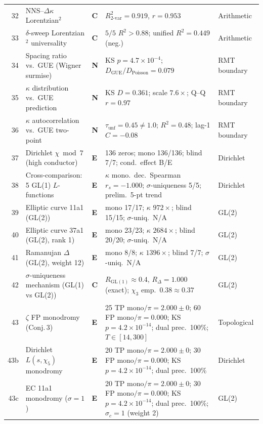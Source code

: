 \documentclass[11pt, a4paper]{article}
\theoremstyle{definition}
\theoremstyle{plain}
\begin{document}
\begin{center}
\begin{longtable}{@{}r l l p{4.2cm} l@{}}
32 & NNS--$\Delta\kappa$ Lorentzian$^2$ & \textbf{C} & $R^2_\text{2-var}{=}0.919$, $r{=}0.953$ & Arithmetic \\
33 & $\delta$-sweep Lorentzian$^2$ universality & \textbf{C} & $5/5$ $R^2{>}0.88$; unified $R^2{=}0.449$ (neg.) & Arithmetic \\
\midrule
34 & Spacing ratio vs.\ GUE (Wigner surmise)  & \textbf{N} & KS $p{=}4.7{\times}10^{-4}$; $D_\text{GUE}/D_\text{Poisson}{=}0.079$ & RMT boundary \\
35 & $\kappa$ distribution vs.\ GUE prediction & \textbf{N} & KS $D{=}0.361$; scale $7.6{\times}$; Q--Q $r{=}0.97$ & RMT boundary \\
36 & $\kappa$ autocorrelation vs.\ GUE two-point & \textbf{N} & $\tau_\text{unf}{=}0.45{\neq}1.0$; $R^2{=}0.48$; lag-1 $C{=}{-}0.08$ & RMT boundary \\
\midrule
37 & Dirichlet $\chi\bmod 7$ (high conductor) & \textbf{E} & 136 zeros; mono 136/136; blind 7/7; cond.\ effect B/E & Dirichlet \\
38 & Cross-comparison: 5 GL(1) $L$-functions & \textbf{E} & $\kappa$ mono.\ dec.\ Spearman $r_s{=}{-}1.000$; $\sigma$-uniqueness 5/5; prelim.\ 5-pt trend & Dirichlet \\
\midrule
39 & Elliptic curve 11a1 (GL(2)) & \textbf{E} & mono 17/17; $\kappa$ $972\times$; blind 15/15; $\sigma$-uniq.\ N/A & GL(2) \\
40 & Elliptic curve 37a1 (GL(2), rank 1) & \textbf{E} & mono 23/23; $\kappa$ $2684\times$; blind 20/20; $\sigma$-uniq.\ N/A & GL(2) \\
41 & Ramanujan $\Delta$ (GL(2), weight 12) & \textbf{E} & mono 8/8; $\kappa$ $1396\times$; blind 7/7; $\sigma$-uniq.\ N/A & GL(2) \\
42 & $\sigma$-uniqueness mechanism (GL(1) vs GL(2)) & \textbf{C} & $R_{\mathrm{GL}(1)}{\approx}0.4$, $R_{\Delta}{=}1.000$ (exact); $\chi_3$ emp.\ $0.38{\approx}0.37$ & GL(2) \\
\midrule
43 & $\zeta$ FP monodromy (Conj.\,3) & \textbf{E} & 25 TP mono$/\pi{=}2.000{\pm}0$; 60 FP mono$/\pi{=}0.000$; KS $p{=}4.2{\times}10^{-14}$; dual prec.\ 100\%; $T{\in}[14{,}300]$ & Topological \\
43b & Dirichlet $L(s{,}\chi_5)$ monodromy & \textbf{E} & 20 TP mono$/\pi{=}2.000{\pm}0$; 30 FP mono$/\pi{=}0.000$; KS $p{=}4.2{\times}10^{-14}$; dual prec.\ 100\% & Dirichlet \\
43c & EC 11a1 monodromy ($\sigma{=}1$) & \textbf{E} & 20 TP mono$/\pi{=}2.000{\pm}0$; 30 FP mono$/\pi{=}0.000$; KS $p{=}4.2{\times}10^{-14}$; dual prec.\ 100\%; $\sigma_c{=}1$ (weight 2) & GL(2) \\

\end{longtable}
\end{center}
\end{document}
